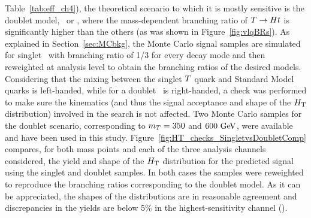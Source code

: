 Table~\ref{tab:eff_ch4}), the theoretical
scenario to which it is mostly sensitive is the doublet
model, \TB\ or \XT,
where the mass-dependent branching ratio of $\T \to Ht$ is
significantly higher than the others (as was shown in Figure~\ref{fig:vlqBRs}).
As explained in Section~\ref{sec:MCbkg}, the Monte Carlo signal samples
are simulated for singlet \T\ with branching ratio of 1/3 for
every decay mode and then reweighted at analysis level to obtain the
branching ratios of the desired models. 
Considering that the mixing between the singlet $\T$ quark and Standard 
Model quarks is left-handed, while for a doublet \T\ is right-handed,
a check was performed to make sure the kinematics (and thus the signal acceptance and shape
of the $\HT$ distribution)
involved in the search is not affected.
Two Monte Carlo samples for the doublet scenario, 
corresponding to $m_{\T}=350$ and $600\gev$, were available and
have been used in this study. 
Figure~\ref{fig:HT_checks_SingletvsDoubletComp} compares, for both mass
points and each of the three analysis channels considered, the yield 
and shape of the $\HT$ distribution for the 
predicted signal using the singlet and doublet samples. 
In both cases the samples were reweighted to reproduce
the branching ratios corresponding to the doublet model. 
As it can be appreciated, the shapes of the distributions
are in reasonable agreement and discrepancies in the yields 
are below 5\% in the highest-sensitivity channel (\chiv).

